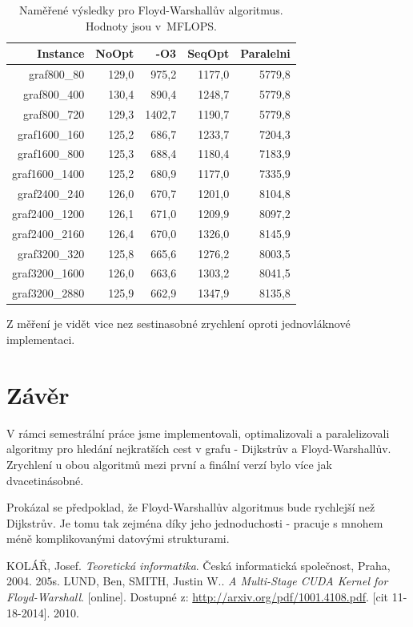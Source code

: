 \documentclass[a4paper,11pt]{article}
\begin{document}
\begin{table}[H]
  \begin{center}
      \begin{tabular}{|r|r|r|r|r|}
      \hline
      Instance  	& NoOpt	    & -O3     & SeqOpt	& Paralelni	\\ \hline
      graf800\_80  	& 129,0     & 975,2   & 1177,0	& 5779,8     	\\ \hline
      graf800\_400     	& 130,4     & 890,4   & 1248,7	& 5779,8     	\\ \hline
      graf800\_720  	& 129,3     & 1402,7  & 1190,7	& 5779,8     	\\ \hline
      graf1600\_160    	& 125,2     & 686,7   & 1233,7	& 7204,3     	\\ \hline
      graf1600\_800  	& 125,3     & 688,4   & 1180,4	& 7183,9    	\\ \hline
      graf1600\_1400   	& 125,2     & 680,9   & 1177,0	& 7335,9    	\\ \hline
      graf2400\_240  	& 126,0     & 670,7   & 1201,0	& 8104,8       	\\ \hline
      graf2400\_1200   	& 126,1     & 671,0   & 1209,9	& 8097,2      	\\ \hline
      graf2400\_2160  	& 126,4     & 670,0   & 1326,0	& 8145,9       	\\ \hline
      graf3200\_320    	& 125,8     & 665,6   & 1276,2	& 8003,5       	\\ \hline
      graf3200\_1600  	& 126,0     & 663,6   & 1303,2	& 8041,5       	\\ \hline
      graf3200\_2880   	& 125,9     & 662,9   & 1347,9	& 8135,8       	\\ \hline
      \end{tabular}
  \caption{Naměřené výsledky pro Floyd-Warshallův algoritmus. Hodnoty jsou v~MFLOPS.}
  \label{tab:fw1}
  \end{center}
\end{table}
Z měření je vidět vice nez sestinasobné zrychlení oproti jednovláknové implementaci.

\newpage

\section{Závěr}
V rámci semestrální práce jsme implementovali, optimalizovali a paralelizovali algoritmy pro hledání nejkratších cest v grafu - Dijkstrův a Floyd-Warshallův. Zrychlení u obou algoritmů mezi první a finální verzí bylo více jak dvacetinásobné.
\par
Prokázal se předpoklad, že Floyd-Warshallův algoritmus bude rychlejší než Dijkstrův. Je tomu tak zejména díky jeho jednoduchosti - pracuje s mnohem méně komplikovanými datovými strukturami.


\newpage
\begin{thebibliography}{1}
   KOLÁŘ, Josef.
    \emph{Teoretická informatika}.
    Česká informatická společnost, Praha, 2004. 205s.
   LUND, Ben, SMITH, Justin W..
    \emph{A Multi-Stage CUDA Kernel for Floyd-Warshall}.
    [online]. Dostupné z: \url{http://arxiv.org/pdf/1001.4108.pdf}. [cit 11-18-2014]. 2010.
\end{thebibliography}
\end{document}
